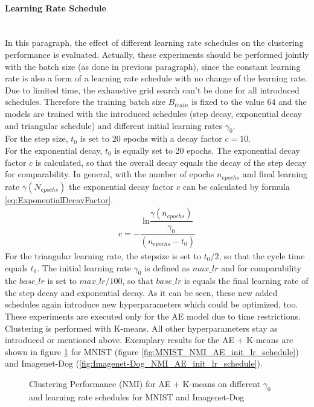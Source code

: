 \documentclass[12pt,DIV14,BCOR12mm,a4paper,footexclude,headinclude,halfparskip-,twoside,openright,cleardoubleempty,idxtotoc,bibtotoc,listtotoc,abstracton]{scrreprt} %
\numberwithin{equation}{chapter}
\begin{document}
\paragraph{Learning Rate Schedule}\hfill \\
In this paragraph, the effect of different learning rate schedules on the clustering performance is evaluated. Actually, these experiments should be performed jointly with the batch size (as done in previous paragraph), since the constant learning rate is also a form of a learning rate schedule with no change of the learning rate. Due to limited time, the exhaustive grid search can't be done for all introduced schedules. Therefore the training batch size $B_{train}$ is fixed to the value $64$ and the models are trained with the introduced schedules (step decay, exponential decay and triangular schedule) and different initial learning rates $\gamma_0$.\\
For the step size, $t_0$ is set to $20$ epochs with a decay factor $c=10$.\\
For the exponential decay, $t_0$ is equally set to $20$ epochs. The exponential decay factor $c$ is calculated, so that the overall decay equals the decay of the step decay for comparability. In general, with the number of epochs $n_{epochs}$ and final learning rate $\gamma(N_{epochs})$ the exponential decay factor $c$ can be calculated by formula \ref{eq:ExponentialDecayFactor}. 
\begin{align}
	c=-\dfrac{\textrm{ln}\dfrac{\gamma(n_{epochs})}{\gamma_0}}{(n_{epochs}-t_0)}\label{eq:ExponentialDecayFactor}
\end{align}
For the triangular learning rate, the stepsize is set to $t_0/2$, so that the cycle time equals $t_0$. The initial learning rate $\gamma_0$ is defined as $max\_lr$ and for comparability the $base\_lr$ is set to $max\_lr/100$, so that $base\_lr$ is equals the final learning rate of the step decay and exponential decay. As it can be seen, these new added schedules again introduce new hyperparameters which could be optimized, too.\\
These experiments are executed only for the AE model due to time restrictions. Clustering is performed with K-means. All other hyperparameters stay as introduced or mentioned above. Exemplary results for the AE + K-means are shown in figure \ref{fig:ClusterPerformance_AE_init_lr_schedule} for MNIST (figure \ref{fig:MNIST_NMI_AE_init_lr_schedule}) and Imagenet-Dog (\ref{fig:Imagenet-Dog_NMI_AE_init_lr_schedule}).
	 \begin{figure}[htb!]
		\centering
		\qquad
		\caption{Clustering Performance (NMI) for AE + K-means on different $\gamma_0$ and learning rate schedules for MNIST and Imagenet-Dog}
		\label{fig:ClusterPerformance_AE_init_lr_schedule}
	\end{figure}
\end{document}
